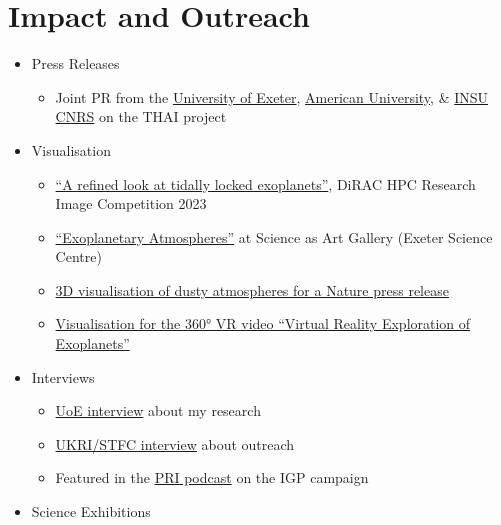 \documentclass[a4paper, 11pt]{article}
\begin{document}
\section{Impact and Outreach}
\begin{itemize}[nosep, leftmargin=10pt]
    \item Press Releases
    \begin{itemize}
        \item Joint PR from the \href{https://www.exeter.ac.uk/research/news/articles/questtouncoverintricacies.html}{University of Exeter}, \href{https://www.american.edu/news/20220811-trappist-1.cfm}{American University}, \& \href{https://www.insu.cnrs.fr/fr/cnrsinfo/la-quete-pour-percer-le-mystere-des-climats-de-planetes-similaires-la-terre-avance}{INSU CNRS} on the THAI project
    \end{itemize}
    \item Visualisation
    \begin{itemize}
        \item \href{https://dirac.ac.uk/research-image-competition-2023}{``A refined look at tidally locked exoplanets''}, DiRAC HPC Research Image Competition 2023
        \item \href{https://exetersciencecentre.org/gallery/denis_sergeev_uoe_exoplanets}{``Exoplanetary Atmospheres''} at Science as Art Gallery (Exeter Science Centre)
        \item \href{https://phys.org/news/2020-06-presence-airborne-signify-habitability-distant.html}{3D visualisation of dusty atmospheres for a Nature press release}
        \item \href{https://youtu.be/Vnke9dWofR8&t=180}{Visualisation for the 360° VR video ``Virtual Reality Exploration of Exoplanets''}
    \end{itemize}
    \item Interviews
    \begin{itemize}
        \item \href{https://youtu.be/_Aus842EZWk}{UoE interview} about my research
        \item \href{https://youtu.be/PzQSfCwp0B8}{UKRI/STFC interview} about outreach
        \item Featured in the \href{https://theworld.org/stories/2018-08-03/sea-and-sky-scientists-brave-wicked-weather-explore-key-ocean-current}{PRI podcast} on the IGP campaign
    \end{itemize}
    \item Science Exhibitions
    \begin{itemize}

\end{itemize}
\end{itemize}
\end{document}

